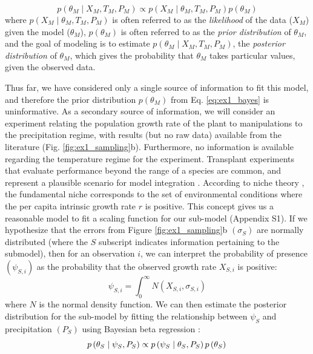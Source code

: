 \documentclass[11pt]{article}
\begin{document}
\begin{equation}
\label{eq:ex1_bayes}
	p\left (\theta_M \mid X_M,T_M,P_M \right ) \propto 
	p \left(X_M \mid \theta_M, T_M, P_M \right)
	p \left(\theta_M \right)
\end{equation}
where \(p\left(X_M \mid \theta_M, T_M, P_M \right)\) is often referred to as the \emph{likelihood} of the data (\(X_M\)) given the model (\(\theta_M\)), \(p\left(\theta_M \right)\) is often referred to as the \emph{prior distribution} of \(\theta_M\), and the goal of modeling is to estimate \(p\left (\theta_M \mid X_M,T_M,P_M \right )\), the \emph{posterior distribution} of \(\theta_M\), which gives the probability that \(\theta_M\) takes particular values, given the observed data.

Thus far, we have considered only a single source of information to fit this model, and therefore the prior distribution \(p\left(\theta_M \right)\) from Eq. \ref{eq:ex1_bayes} is uninformative.
As a secondary source of information, we will consider an experiment relating the population growth rate of the plant to manipulations to the precipitation regime, with results (but no raw data) available from the literature (Fig. \ref{fig:ex1_sampling}b). 
Furthermore, no information is available regarding the temperature regime for the experiment.
Transplant experiments that evaluate performance beyond the range of a species are common, and represent a plausible scenario for model integration \citep{Hargreaves2014}.
According to niche theory \citep{Holt2009}, the fundamental niche corresponds to the set of environmental conditions where the per capita intrinsic growth rate $r$ is positive.
This concept gives us a reasonable model to fit a scaling function for our sub-model (Appendix S1).
If we hypothesize that the errors from Figure \ref{fig:ex1_sampling}b \( \left(\sigma_{S} \right) \) are normally distributed (where the \(S\) subscript indicates information pertaining to the submodel), then for an observation $i$, we can interpret the probability of presence \( \left(\psi_{S,i}\right)\) as the probability that the observed growth rate \(X_{S,i}\) is positive:
\begin{equation}
	\psi_{S,i} = \int_0^\infty N \left(X_{S,i}, \sigma_{S,i} \right)
\end{equation}
where \(N\) is the normal density function.
We can then estimate the posterior distribution for the sub-model by fitting the relationship between \(\psi_S\) and precipitation \( \left( P_S \right) \) using Bayesian beta regression \citep{Ferrari2004}:
\begin{equation}
\label{eq:ex1_thetas}
	p\left (\theta_S \mid \psi_S,P_S \right ) \propto 
	p \left(\psi_S \mid \theta_S, P_S \right)
	p \left(\theta_S \right) \\
\end{equation}
\end{document}
